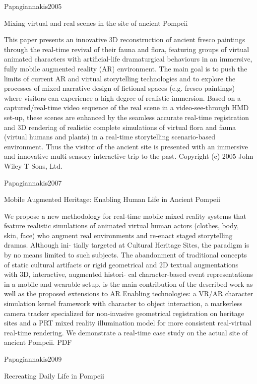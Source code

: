 Papagiannakis2005

Mixing virtual and real scenes in the site of ancient Pompeii

This paper presents an innovative 3D reconstruction of ancient fresco paintings through the real-time revival of their fauna and flora, featuring groups of virtual animated characters with artificial-life dramaturgical behaviours in an immersive, fully mobile augmented reality (AR) environment. The main goal is to push the limits of current AR and virtual storytelling technologies and to explore the processes of mixed narrative design of fictional spaces (e.g. fresco paintings) where visitors can experience a high degree of realistic immersion. Based on a captured/real-time video sequence of the real scene in a video-see-through HMD set-up, these scenes are enhanced by the seamless accurate real-time registration and 3D rendering of realistic complete simulations of virtual flora and fauna (virtual humans and plants) in a real-time storytelling scenario-based environment. Thus the visitor of the ancient site is presented with an immersive and innovative multi-sensory interactive trip to the past. Copyright (c) 2005 John Wiley T Sons, Ltd.

Papagiannakis2007

Mobile Augmented Heritage: Enabling Human Life in Ancient Pompeii

We propose a new methodology for real-time mobile mixed reality systems that feature realistic simulations of animated virtual human actors (clothes, body, skin, face) who augment real environments and re-enact staged storytelling dramas. Although ini- tially targeted at Cultural Heritage Sites, the paradigm is by no means limited to such subjects. The abandonment of traditional concepts of static cultural artifacts or rigid geometrical and 2D textual augmentations with 3D, interactive, augmented histori- cal character-based event representations in a mobile and wearable setup, is the main contribution of the described work as well as the proposed extensions to AR Enabling technologies: a VR/AR character simulation kernel framework with character to object interaction, a markerless camera tracker specialized for non-invasive geometrical registration on heritage sites and a PRT mixed reality illumination model for more consistent real-virtual real-time rendering. We demonstrate a real-time case study on the actual site of ancient Pompeii. PDF

Papagiannakis2009

Recreating Daily Life in Pompeii

